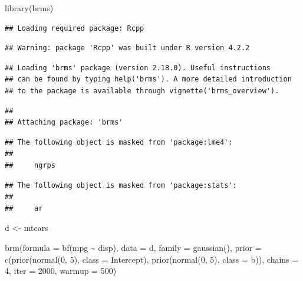 \documentclass[
]{book}
\newenvironment{Shaded}{\begin{snugshade}}{\end{snugshade}}
\newcommand{\AttributeTok}[1]{\textcolor[rgb]{0.77,0.63,0.00}{#1}}
\newcommand{\DecValTok}[1]{\textcolor[rgb]{0.00,0.00,0.81}{#1}}
\newcommand{\FunctionTok}[1]{\textcolor[rgb]{0.00,0.00,0.00}{#1}}
\newcommand{\NormalTok}[1]{#1}
\newcommand{\OtherTok}[1]{\textcolor[rgb]{0.56,0.35,0.01}{#1}}
\newcommand{\SpecialCharTok}[1]{\textcolor[rgb]{0.00,0.00,0.00}{#1}}
\begin{document}
\begin{Shaded}
\begin{Highlighting}[]
\FunctionTok{library}\NormalTok{(brms)}
\end{Highlighting}
\end{Shaded}

\begin{verbatim}
## Loading required package: Rcpp
\end{verbatim}

\begin{verbatim}
## Warning: package 'Rcpp' was built under R version 4.2.2
\end{verbatim}

\begin{verbatim}
## Loading 'brms' package (version 2.18.0). Useful instructions
## can be found by typing help('brms'). A more detailed introduction
## to the package is available through vignette('brms_overview').
\end{verbatim}

\begin{verbatim}
## 
## Attaching package: 'brms'
\end{verbatim}

\begin{verbatim}
## The following object is masked from 'package:lme4':
## 
##     ngrps
\end{verbatim}

\begin{verbatim}
## The following object is masked from 'package:stats':
## 
##     ar
\end{verbatim}

\begin{Shaded}
\begin{Highlighting}[]
\NormalTok{d }\OtherTok{\textless{}{-}}\NormalTok{ mtcars}

\FunctionTok{brm}\NormalTok{(}\AttributeTok{formula =} \FunctionTok{bf}\NormalTok{(mpg }\SpecialCharTok{\textasciitilde{}}\NormalTok{ disp),}
    \AttributeTok{data =}\NormalTok{ d,}
    \AttributeTok{family =} \FunctionTok{gaussian}\NormalTok{(),}
    \AttributeTok{prior =} \FunctionTok{c}\NormalTok{(}\FunctionTok{prior}\NormalTok{(}\FunctionTok{normal}\NormalTok{(}\DecValTok{0}\NormalTok{, }\DecValTok{5}\NormalTok{), }\AttributeTok{class =}\NormalTok{ Intercept),}
              \FunctionTok{prior}\NormalTok{(}\FunctionTok{normal}\NormalTok{(}\DecValTok{0}\NormalTok{, }\DecValTok{5}\NormalTok{), }\AttributeTok{class =}\NormalTok{ b)),}
    \AttributeTok{chains =} \DecValTok{4}\NormalTok{, }\AttributeTok{iter =} \DecValTok{2000}\NormalTok{, }\AttributeTok{warmup =} \DecValTok{500}\NormalTok{)}
\end{Highlighting}
\end{Shaded}
\end{document}
